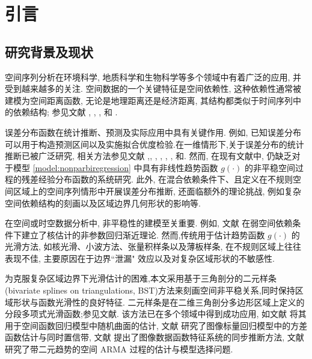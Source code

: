 \documentclass[a4paper,openay,14pt]{ctexbook}
\numberwithin{equation}{section}
\numberwithin{lem}{section}
\newcommand{\chapterwithfancyheader}[1]{  
    \chapter{#1} %
    \thispagestyle{fancy} %
}
\begin{document}
\baselineskip=30pt



\clearpage %
\tableofcontents
\thispagestyle{empty}
\listoftables
\let\cleardoublepage\clearpage
\listoffigures

\mainmatter
\pagestyle{fancy}\fancyhf{}
\fancyhead[EL]{\leftmark}
\fancyhead[OR]{\leftmark}
\fancyfoot[C]{\thepage }

\chapterwithfancyheader{引言}
\section{研究背景及现状}

空间序列分析在环境科学, 地质科学和生物科学等多个领域中有着广泛的应用, 并受到越来越多的关注. 
空间数据的一个关键特征是空间依赖性, 这种依赖性通常被建模为空间距离函数, 
无论是地理距离还是经济距离, 其结构都类似于时间序列中的依赖结构; 
参见文献 \cite{whittle1954stationary}, \cite{anselin1980estimation}, 
\cite{yao2006gaussian}, \cite{robinson2011asymptotic} 和 \cite{cressie2015statistics}.

误差分布函数在统计推断、预测及实际应用中具有关键作用. 例如, 已知误差分布可以用于构造预测区间以及实施拟合优度检验.在一维情形下,关于误差分布的统计推断已被广泛研究, 相关方法参见文献
\cite{akritas2001non},\cite{cheng2002consistency}, \cite{cheng2005asymptotic}, \cite{muller2007estimating}, \cite{chan2008residual}, \cite{kiwitt2012estimating}, \cite{gu2021smooth}和\cite{zhong2025inference}.
然而, 在现有文献中, 仍缺乏对于模型 \eqref{model:nonparbiregression} 中具有非线性趋势函数 \( g(\cdot) \) 的非平稳空间过程的残差经验分布函数的系统研究. 此外, 在混合依赖条件下、且定义在不规则空间区域上的空间序列情形中开展误差分布推断, 还面临额外的理论挑战, 例如复杂空间依赖结构的刻画以及区域边界几何形状的影响等.

在空间或时空数据分析中, 非平稳性的建模至关重要. 例如, 文献\cite{robinson2011asymptotic} 在弱空间依赖条件下建立了核估计的非参数回归渐近理论. 然而,传统用于估计趋势函数 \( g(\cdot) \) 的光滑方法, 如核光滑、小波方法、张量积样条以及薄板样条, 在不规则区域上往往表现不佳, 主要原因在于边界``泄漏" 效应以及对复杂区域形状的不敏感性.

为克服复杂区域边界下光滑估计的困难,本文采用基于三角剖分的二元样条(bivariate splines on triangulations, BST)方法来刻画空间非平稳关系,同时保持区域形状与函数光滑性的良好特征. 二元样条是在二维三角剖分多边形区域上定义的分段多项式光滑函数;参见文献\cite{lai2013bivariate}. 该方法已在多个领域中得到成功应用, 如文献\cite{guillas2010bivariate} 将其用于空间函数回归模型中随机曲面的估计, 文献\cite{yu2021multivariate} 研究了图像标量回归模型中的方差函数估计与同时置信带, 文献\cite{hu2024statistical} 提出了图像数据函数特征系统的同步推断方法, 文献\cite{zhang2025oracally} 研究了带二元趋势的空间 ARMA 过程的估计与模型选择问题.
\end{document}
